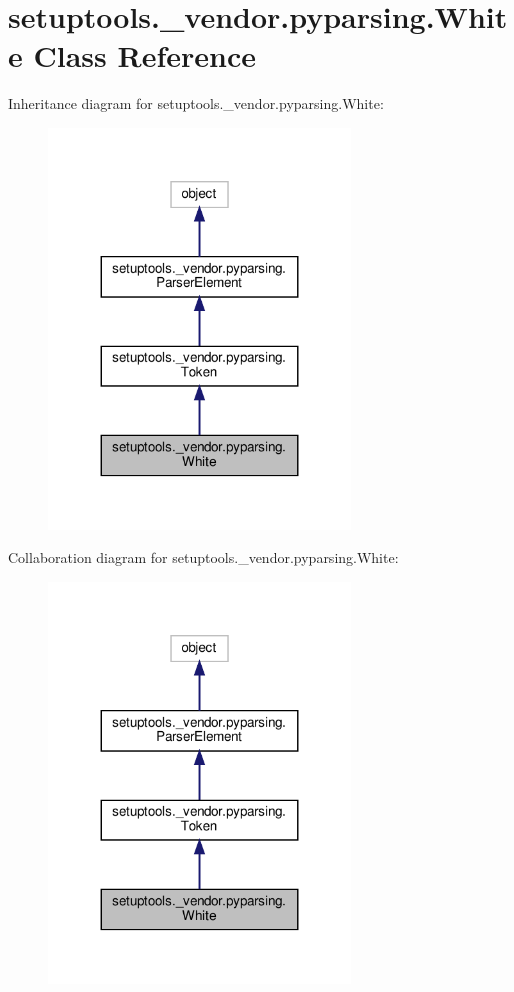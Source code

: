 \hypertarget{classsetuptools_1_1__vendor_1_1pyparsing_1_1White}{}\section{setuptools.\+\_\+vendor.\+pyparsing.\+White Class Reference}
\label{classsetuptools_1_1__vendor_1_1pyparsing_1_1White}


Inheritance diagram for setuptools.\+\_\+vendor.\+pyparsing.\+White\+:
\nopagebreak
\begin{figure}[H]
\begin{center}
\leavevmode
\includegraphics[width=227pt]{classsetuptools_1_1__vendor_1_1pyparsing_1_1White__inherit__graph}
\end{center}
\end{figure}


Collaboration diagram for setuptools.\+\_\+vendor.\+pyparsing.\+White\+:
\nopagebreak
\begin{figure}[H]
\begin{center}
\leavevmode
\includegraphics[width=227pt]{classsetuptools_1_1__vendor_1_1pyparsing_1_1White__coll__graph}
\end{center}
\end{figure}
